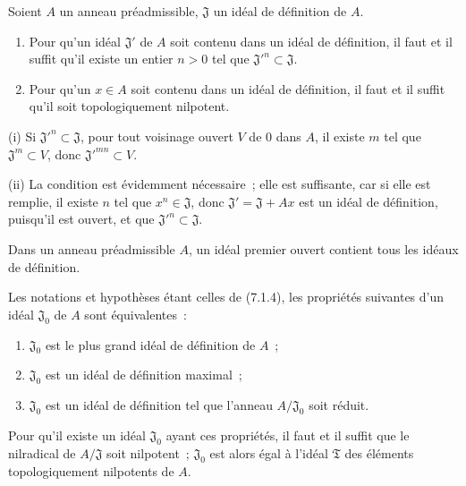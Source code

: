 \begin{proposition}[7.1.4]
\label{0.7.1.4-fr}
Soient $A$ un anneau préadmissible, $\mathfrak J$ un idéal de définition de
$A$.
\begin{enumerate}
  \item[{\upshape(i)}] Pour qu'un idéal $\mathfrak J'$ de $A$ soit contenu
    dans un idéal de définition, il faut et il suffit qu'il existe un entier
    $n>0$ tel que ${\mathfrak J'}^n\subset\mathfrak J$.
  \item[{\upshape(ii)}] Pour qu'un $x\in A$ soit contenu dans un idéal de
    définition, il faut et il suffit qu'il soit topologiquement nilpotent.
\end{enumerate}
\end{proposition}

(i) Si ${\mathfrak J'}^n\subset\mathfrak J$, pour tout voisinage ouvert $V$ de
$0$ dans $A$, il existe $m$ tel que $\mathfrak J^m\subset V$, donc
${\mathfrak J'}^{mn}\subset V$.

(ii) La condition est évidemment nécessaire~; elle est suffisante, car si elle
est remplie, il existe $n$ tel que $x^n\in\mathfrak J$, donc
$\mathfrak J'=\mathfrak J+Ax$ est un idéal de définition, puisqu'il est ouvert,
et que ${\mathfrak J'}^n\subset\mathfrak J$.

\begin{corollary}[7.1.5]
\label{0.7.1.5-fr}
Dans un anneau préadmissible $A$, un idéal premier ouvert contient tous les
idéaux de définition.
\end{corollary}

\begin{corollary}[7.1.6]
\label{0.7.1.6-fr}
Les notations et hypothèses étant celles de \textup{(7.1.4)}, les propriétés suivantes
d'un idéal $\mathfrak J_0$ de $A$ sont équivalentes~:
\begin{enumerate}
  \item[$a)$] $\mathfrak J_0$ est le plus grand idéal de définition de $A$~;
  \item[$b)$] $\mathfrak J_0$ est un idéal de définition maximal~;
  \item[$c)$] $\mathfrak J_0$ est un idéal de définition tel que l'anneau
    $A/\mathfrak J_0$ soit réduit.
\end{enumerate}
Pour qu'il existe un idéal $\mathfrak J_0$ ayant ces propriétés, il faut et il
suffit que le nilradical de $A/\mathfrak J$ soit nilpotent~; $\mathfrak J_0$
est alors égal à l'idéal $\mathfrak T$ des éléments topologiquement nilpotents
de $A$.
\end{corollary}

